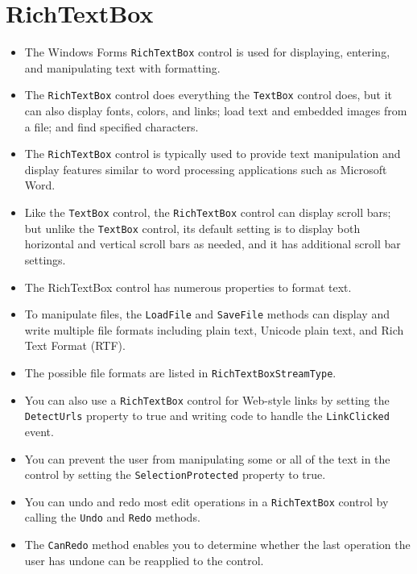 \section{RichTextBox}
\begin{multicols}{2}
	\begin{itemize}
		\item The Windows Forms \texttt{RichTextBox} control is used for displaying, entering, and manipulating text
		with formatting.
		\item The \texttt{RichTextBox} control does everything the \texttt{TextBox} control does, but it can also
		display fonts, colors, and links; load text and embedded images from a file; and find specified
		characters. 
		\item The \texttt{RichTextBox} control is typically used to provide text manipulation and display
		features similar to word processing applications such as Microsoft Word. 
		\item Like the \texttt{TextBox} control, the \texttt{RichTextBox} control can display scroll bars; but unlike the \texttt{TextBox} control, its default setting is
		to display both horizontal and vertical scroll bars as needed, and it has additional scroll bar settings.
		
		\item The RichTextBox control has numerous properties to format text. 
		\item To manipulate files, the \texttt{LoadFile} and \texttt{SaveFile}
		methods can display and write multiple file formats including plain text, Unicode plain text, and
		Rich Text Format (RTF). 
		\item The possible file formats are listed in \texttt{RichTextBoxStreamType}. 
		
		\item You can also use a \texttt{RichTextBox} control for Web-style links by setting the \texttt{DetectUrls} property to
		true and writing code to handle the \texttt{LinkClicked} event. 
		\item You can prevent the user from	manipulating some or all of the text in the control by setting the \texttt{SelectionProtected} property to
		true.
		
		\item You can undo and redo most edit operations in a \texttt{RichTextBox} control by calling the \texttt{Undo} and
		\texttt{Redo} methods. 
		\item The \texttt{CanRedo} method enables you to determine whether the last operation the user has undone can be reapplied to the control.
	\end{itemize}
\end{multicols}


